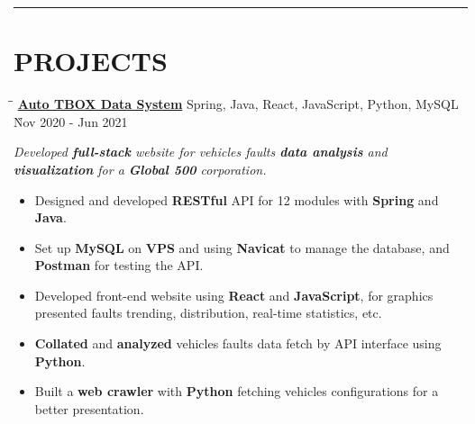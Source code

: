 \documentclass{res}
\begin{document}
\begin{resume}
\vspace{+0.05in}

\vspace{-12pt}
\hspace{-0.55in}
\noindent\rule[0.25\baselineskip]{19.36cm}{0.5pt}    
        
\vspace{-0.2in}
\section{PROJECTS}

    \vspace{0.00in}	 
    \begin{tabbing}
    \hspace{2.391in}\= \hspace{3in}\= \kill %
    \href{https://github.com/DolorHunter/AutoTBOXDataSystem}{\bf Auto TBOX Data System}  \> 
                Spring, Java, React, JavaScript, Python, MySQL \` Nov 2020 - Jun 2021 \\
    \end{tabbing}\vspace{-20pt}      %
    \vspace{-0.1in}
    \textit{Developed {\bf full-stack} website for vehicles faults {\bf data analysis} and
             {\bf visualization} for a {\bf Global 500} corporation.}
    \vspace{-0.1in}
    \begin{itemize} \itemsep 1.5pt %
        \item Designed and developed {\bf RESTful} API for 12 modules with 
                {\bf Spring} and {\bf Java}.
        \item Set up {\bf MySQL} on {\bf VPS} and using {\bf Navicat} to manage the database, and 
                {\bf Postman} for testing the API.
        \item Developed front-end website using {\bf React} and {\bf JavaScript}, for 
                graphics presented faults trending, distribution, real-time statistics, etc.
        \item {\bf Collated} and {\bf analyzed} vehicles faults data fetch by API interface using 
                {\bf Python}.
        \item Built a {\bf web crawler} with {\bf Python} fetching vehicles configurations for 
                a better presentation.
    \end{itemize}


\end{resume}
\end{document}
